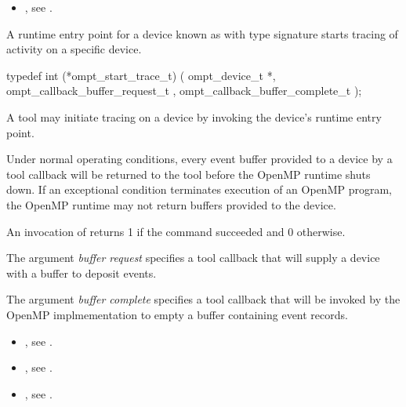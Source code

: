 \crossreferences
\begin{itemize}
\item {},
see .
\end{itemize}

\label{sec:ompt_start_trace_t}

\summary
A runtime entry point for a device known as 
with type signature 
starts tracing of activity on a specific device.

\format
\begin{ccppspecific}
\begin{omptInquiry}
typedef int (*ompt_start_trace_t) (
  ompt_device_t *,
  ompt_callback_buffer_request_t ,
  ompt_callback_buffer_complete_t 
);
\end{omptInquiry}
\end{ccppspecific}

\descr
A tool may initiate tracing on a device by invoking the device's 
runtime entry point.

Under normal operating conditions, every event buffer provided to
a device by a tool callback will be returned to the tool
before the OpenMP runtime shuts down.
If an exceptional condition terminates  execution of an OpenMP
program, the OpenMP runtime may not return buffers provided to the
device.

An invocation of  returns 1 if the command
succeeded and 0 otherwise.

\argdesc

\devicedesc

The argument \emph{buffer request} specifies a tool callback
that will supply a device with a buffer to deposit events.

The argument \emph{buffer complete} specifies a tool callback
that will be invoked by the OpenMP implmementation to empty a buffer
containing event records.

\crossreferences
\begin{itemize}
\item {},
see .
\item {},
see .
\item {},
see .
\end{itemize}

